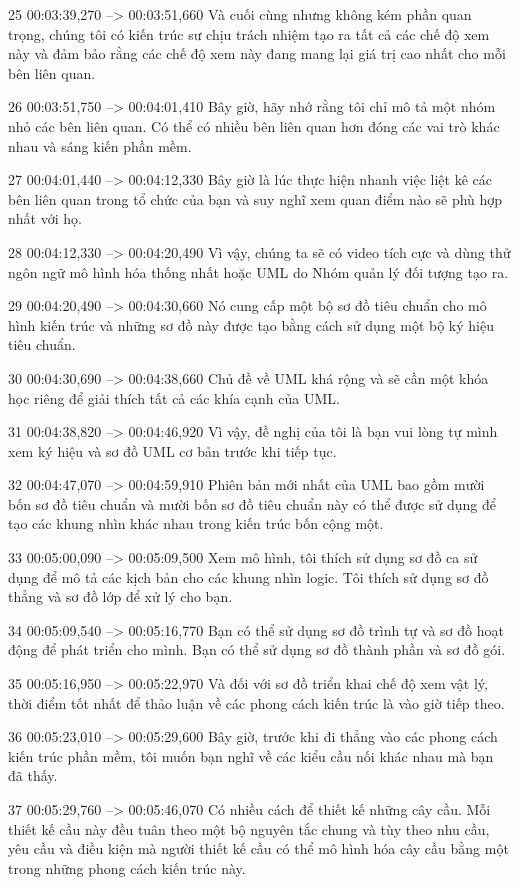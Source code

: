 25
00:03:39,270 --> 00:03:51,660
Và cuối cùng nhưng không kém phần quan trọng, chúng tôi có kiến ​​trúc sư chịu trách nhiệm tạo ra tất cả các chế độ xem này và đảm bảo rằng các chế độ xem này đang mang lại giá trị cao nhất cho mỗi bên liên quan.

26
00:03:51,750 --> 00:04:01,410
Bây giờ, hãy nhớ rằng tôi chỉ mô tả một nhóm nhỏ các bên liên quan.  Có thể có nhiều bên liên quan hơn đóng các vai trò khác nhau và sáng kiến ​​​​phần mềm.

27
00:04:01,440 --> 00:04:12,330
Bây giờ là lúc thực hiện nhanh việc liệt kê các bên liên quan trong tổ chức của bạn và suy nghĩ xem quan điểm nào sẽ phù hợp nhất với họ.

28
00:04:12,330 --> 00:04:20,490
Vì vậy, chúng ta sẽ có video tích cực và dùng thử ngôn ngữ mô hình hóa thống nhất hoặc UML do Nhóm quản lý đối tượng tạo ra.

29
00:04:20,490 --> 00:04:30,660
Nó cung cấp một bộ sơ đồ tiêu chuẩn cho mô hình kiến ​​trúc và những sơ đồ này được tạo bằng cách sử dụng một bộ ký hiệu tiêu chuẩn.

30
00:04:30,690 --> 00:04:38,660
Chủ đề về UML khá rộng và sẽ cần một khóa học riêng để giải thích tất cả các khía cạnh của UML.

31
00:04:38,820 --> 00:04:46,920
Vì vậy, đề nghị của tôi là bạn vui lòng tự mình xem ký hiệu và sơ đồ UML cơ bản trước khi tiếp tục.

32
00:04:47,070 --> 00:04:59,910
Phiên bản mới nhất của UML bao gồm mười bốn sơ đồ tiêu chuẩn và mười bốn sơ đồ tiêu chuẩn này có thể được sử dụng để tạo các khung nhìn khác nhau trong kiến ​​trúc bốn cộng một.

33
00:05:00,090 --> 00:05:09,500
Xem mô hình, tôi thích sử dụng sơ đồ ca sử dụng để mô tả các kịch bản cho các khung nhìn logic.  Tôi thích sử dụng sơ đồ thẳng và sơ đồ lớp để xử lý cho bạn.

34
00:05:09,540 --> 00:05:16,770
Bạn có thể sử dụng sơ đồ trình tự và sơ đồ hoạt động để phát triển cho mình.  Bạn có thể sử dụng sơ đồ thành phần và sơ đồ gói.

35
00:05:16,950 --> 00:05:22,970
Và đối với sơ đồ triển khai chế độ xem vật lý, thời điểm tốt nhất để thảo luận về các phong cách kiến ​​trúc là vào giờ tiếp theo.

36
00:05:23,010 --> 00:05:29,600
Bây giờ, trước khi đi thẳng vào các phong cách kiến ​​trúc phần mềm, tôi muốn bạn nghĩ về các kiểu cầu nối khác nhau mà bạn đã thấy.

37
00:05:29,760 --> 00:05:46,070
Có nhiều cách để thiết kế những cây cầu.  Mỗi thiết kế cầu này đều tuân theo một bộ nguyên tắc chung và tùy theo nhu cầu, yêu cầu và điều kiện mà người thiết kế cầu có thể mô hình hóa cây cầu bằng một trong những phong cách kiến ​​trúc này.

